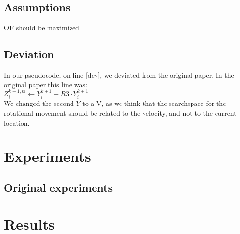 \documentclass[runningheads]{llncs}
\begin{document}
\subsection{Assumptions}
OF should be maximized\\


\subsection{Deviation}
In our pseudocode, on line \ref{dev}, we deviated from the original paper. In the original paper this line was: \\
$Z_i^{k+1, m} \leftarrow Y_i^{k+1} + R3 \cdot Y_i^{k+1}$ \\
We changed the second $ Y $ to a V, as we think that the searchspace for the rotational movement should be related to the velocity, and not to the current location.


\section{Experiments}



\subsection{Original experiments}


\section{Results}
\end{document}
